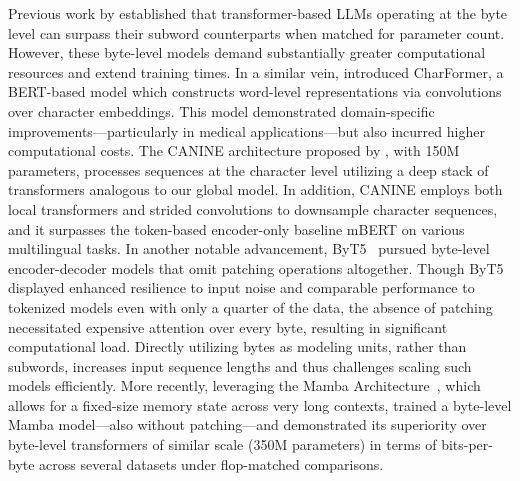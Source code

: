 Previous work by \cite{Choe2019BridgingTG} established that transformer-based LLMs operating at the byte level can surpass their subword counterparts when matched for parameter count. However, these byte-level models demand substantially greater computational resources and extend training times. In a similar vein, \cite{el2020characterbert} introduced CharFormer, a BERT-based model which constructs word-level representations via convolutions over character embeddings. This model demonstrated domain-specific improvements—particularly in medical applications—but also incurred higher computational costs. The CANINE architecture proposed by \cite{clark2022canine}, with 150M parameters, processes sequences at the character level utilizing a deep stack of transformers analogous to our global model. In addition, CANINE employs both local transformers and strided convolutions to downsample character sequences, and it surpasses the token-based encoder-only baseline mBERT on various multilingual tasks. In another notable advancement, ByT5~\citep{xue2022byt5} pursued byte-level encoder-decoder models that omit patching operations altogether. Though ByT5 displayed enhanced resilience to input noise and comparable performance to tokenized models even with only a quarter of the data, the absence of patching necessitated expensive attention over every byte, resulting in significant computational load. Directly utilizing bytes as modeling units, rather than subwords, increases input sequence lengths and thus challenges scaling such models efficiently. More recently, leveraging the Mamba Architecture~\citep{gu2023mamba}, which allows for a fixed-size memory state across very long contexts, \cite{wang2024mambabyte} trained a byte-level Mamba model—also without patching—and demonstrated its superiority over byte-level transformers of similar scale (350M parameters) in terms of bits-per-byte across several datasets under flop-matched comparisons.

